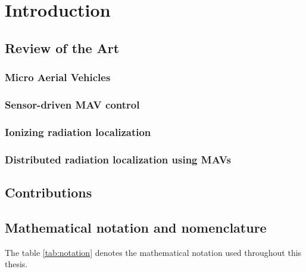\documentclass[a4paper,11pt,titlepage,twoside]{book}
\begin{document}


\pagestyle{fancy}

\tableofcontents


\cleardoublepage


\chapter{Introduction}

\section{Review of the Art}

\subsection{Micro Aerial Vehicles}

\subsection{Sensor-driven MAV control}

\subsection{Ionizing radiation localization}

\subsection{Distributed radiation localization using MAVs}

\section{Contributions}

\section{Mathematical notation and nomenclature}


The table \ref{tab:notation} denotes the mathematical notation used throughout this thesis.
\end{document}
